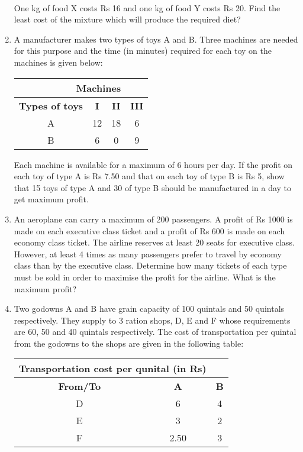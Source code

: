 \begin{enumerate}[label=\arabic*.,ref=\thesubsection.\theenumi]
\begin{tabular}{|c|c|c|c|}
\end{tabular}\\
One kg of food X costs Rs 16 and one kg of food Y costs Rs 20. Find the least
cost of the mixture which will produce the required diet?\\
\item A manufacturer makes two types of toys A and B. Three machines are needed
for this purpose and the time (in minutes) required for each toy on the machines
is given below:\\
\begin{tabular}{|c|c|c|c|}
\hline
 \multicolumn{3}{|r}{\textbf{ Machines}}& \\ \cline{2-4}
\hline
\textbf {Types of toys}&\textbf{I}&\textbf{II}&\textbf{III}\\
\hline
A&12&18&6\\
\hline
 B&6&0&9\\
 \hline 

\end{tabular}



Each machine is available for a maximum of 6 hours per day. If the profit on
each toy of type A is Rs 7.50 and that on each toy of type B is Rs 5, show that 15
toys of type A and 30 of type B should be manufactured in a day to get maximum
profit.\\
\item An aeroplane can carry a maximum of 200 passengers. A profit of Rs 1000 is
made on each executive class ticket and a profit of Rs 600 is made on each
economy class ticket. The airline reserves at least 20 seats for executive class.
However, at least 4 times as many passengers prefer to travel by economy class
than by the executive class. Determine how many tickets of each type must be
sold in order to maximise the profit for the airline. What is the maximum profit?\\
\item Two godowns A and B have grain capacity of 100 quintals and 50 quintals
respectively. They supply to 3 ration shops, D, E and F whose requirements are
60, 50 and 40 quintals respectively. The cost of transportation per quintal from
the godowns to the shops are given in the following table:\\
\begin{tabular}{|c|c|c|}
\hline
 \multicolumn{2}{|l}{\textbf{ Transportation cost per qunital (in Rs)}}& \\ \cline{2-3}
\hline
\textbf {From/To}&\textbf{A}&\textbf{B}\\
\hline
D&6&4\\
\hline
 E&3&2\\
 \hline 
 F&2.50&3\\
 \hline


\end{tabular}
\end{enumerate}
